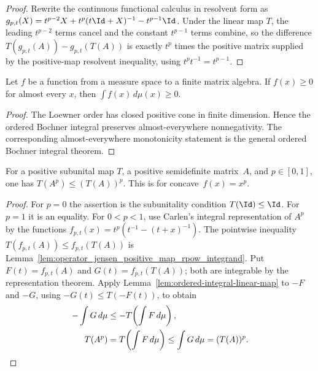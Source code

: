 \begin{proof}
    \leanok
    Rewrite the continuous functional calculus in resolvent form as
    $g_{p,t}(X)=t^{p-2}X+t^p(t\Id+X)^{-1}-t^{p-1}\Id$.
    Under the linear map $T$, the leading $t^{p-2}$ terms cancel and the
    constant $t^{p-1}$ terms combine, so the difference
    $T(g_{p,t}(A))-g_{p,t}(T(A))$ is exactly $t^p$ times the positive matrix
    supplied by the positive-map resolvent inequality, using
    $t^pt^{-1}=t^{p-1}$.
\end{proof}

\begin{lemma}\label{lem:operator_jensen_integral_order}
    \leanok
    Let $f$ be a function from a measure space to a finite matrix algebra. If
    $f(x)\ge0$ for almost every $x$, then
    $\int f(x)\,d\mu(x)\ge0$.
\end{lemma}

\begin{proof}
    \leanok
    The Loewner order has closed positive cone in finite dimension. Hence the
    ordered Bochner integral preserves almost-everywhere nonnegativity. The
    corresponding almost-everywhere monotonicity statement is the general
    ordered Bochner integral theorem.
\end{proof}

\begin{theorem}\label{thm:posMap_rpow_concave_jensen}
    \leanok
    For a positive subunital map $T$, a positive semidefinite matrix~$A$,
    and $p\in[0,1]$, one has $T(A^p)\le(T(A))^p$.
    This is \cite[Theorem~5.13]{Wolf2012Quantum} for concave~$f(x)=x^p$.
\end{theorem}

\begin{proof}\leanok
    For $p=0$ the assertion is the subunitality condition
    $T(\Id)\le\Id$. For $p=1$ it is an equality. For $0<p<1$, use Carlen's
    integral representation of $A^p$ by the functions
    $f_{p,t}(x)=t^p(t^{-1}-(t+x)^{-1})$. The pointwise inequality
    $T(f_{p,t}(A))\le f_{p,t}(T(A))$ is
    Lemma~\ref{lem:operator_jensen_positive_map_rpow_integrand}. Put
    $F(t)=f_{p,t}(A)$ and $G(t)=f_{p,t}(T(A))$; both are integrable by the
    representation theorem. Apply Lemma~\ref{lem:ordered-integral-linear-map}
    to $-F$ and $-G$, using $-G(t)\leq T(-F(t))$, to obtain
    \begin{align}
        -\int G\,d\mu&\leq -T\!\left(\int F\,d\mu\right),\notag\\
        T(A^p)&=T\!\left(\int F\,d\mu\right)
        \leq\int G\,d\mu=(T(A))^p.
        \label{eq:ch06_concave_power_integral_jensen}
    \end{align}
\end{proof}

